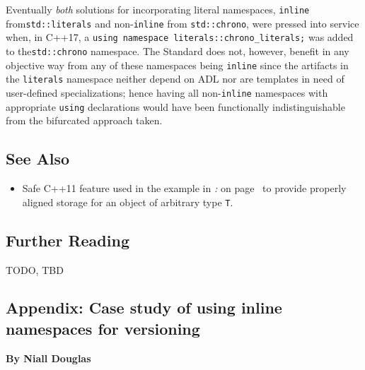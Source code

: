 Eventually \emph{both} solutions for incorporating literal namespaces,
\lstinline!inline! from\linebreak[4] \lstinline!std::literals! and non-\lstinline!inline! from
\lstinline!std::chrono!, were pressed into service when, in C++17, a
\mbox{\lstinline!using!~\lstinline!namespace!~\lstinline!literals::chrono_literals;!}
was added to the\linebreak[4]
 \lstinline!std::chrono! namespace. The Standard does not, however, benefit in any objective way from any of
these namespaces being \lstinline!inline! since the artifacts in the
\lstinline!literals! namespace neither depend on ADL nor are templates in
need of user-defined specializations; hence having all
non-\lstinline!inline! namespaces with appropriate \lstinline!using!
declarations would have been functionally indistinguishable from the
bifurcated approach taken.

\subsection[See Also]{See Also}\label{see-also}

\begin{itemize}
\item{%
Safe C++11 feature used in the example in  \textit{: } on page~\pageref{build-modes-and-abi-link-safety} to provide properly aligned storage for an object of arbitrary type \lstinline!T!.}
\end{itemize}

\subsection[Further Reading]{Further Reading}\label{further-reading}

TODO, TBD

\subsection[Appendix: Case study of using \lstinline!inline! namespaces for versioning]{Appendix: Case study of using {\SubsecCode inline} namespaces for versioning}\label{appendix:-case-study-of-using-inline-namespaces-for-versioning}

\noindent\textbf{By Niall Douglas}\\[.5ex]

